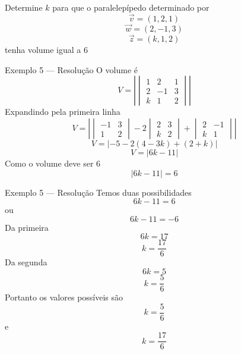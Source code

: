 \begin{question}
  Determine $k$ para que o paralelepípedo determinado por
  \[
  \vec{v}=(1,2,1)
  \]
  \[
  \vec{w}=(2,-1,3)
  \]
  \[
  \vec{z}=(k,1,2)
  \]
  tenha volume igual a $6$
\end{question}

\begin{resolution}{Exemplo 5 — Resolução}
O volume é
\[
V=
\left|
\begin{vmatrix}
1&2&1\\
2&-1&3\\
k&1&2
\end{vmatrix}
\right|
\]
Expandindo pela primeira linha
\[
V=
\left|
\begin{vmatrix}
-1&3\\
1&2
\end{vmatrix}
-
2
\begin{vmatrix}
2&3\\
k&2
\end{vmatrix}
+
\begin{vmatrix}
2&-1\\
k&1
\end{vmatrix}
\right|
\]
\[
V=
|-5-2(4-3k)+(2+k)|
\]
\[
V=
|6k-11|
\]
Como o volume deve ser $6$
\[
|6k-11|=6
\]
\end{resolution}

\begin{resolution}{Exemplo 5 — Resolução}
Temos duas possibilidades
\[
6k-11=6
\]
ou
\[
6k-11=-6
\]
Da primeira
\[
6k=17
\]
\[
k=\frac{17}{6}
\]
Da segunda
\[
6k=5
\]
\[
k=\frac56
\]
Portanto os valores possíveis são
\[
k=\frac56
\]
e
\[
k=\frac{17}{6}
\]
\end{resolution}
